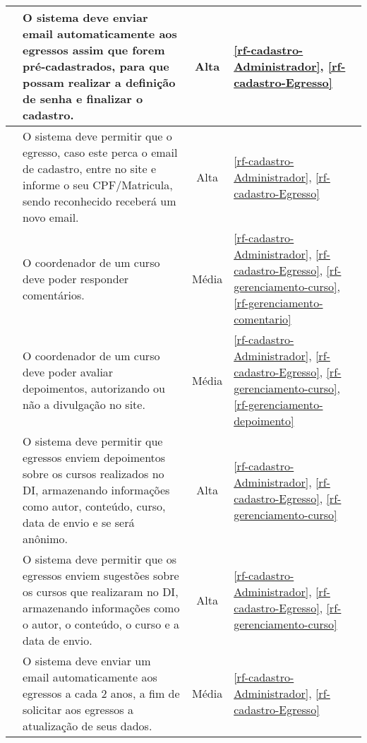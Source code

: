 \begin{landscape}
\begin{longtable}{|c|p{16.5cm}|c|p{2.3cm}|}
			\RF\label{rf-email-cadastro-egresso} & O sistema deve enviar email automaticamente aos egressos assim que forem pré-cadastrados, para que possam realizar a definição de senha e finalizar o cadastro. & Alta & 	\ref{rf-cadastro-Administrador},  \ref{rf-cadastro-Egresso} \\ \hline
			
			
			\RF\label{rf-novo-email-cadastro}  & O sistema deve permitir que o egresso, caso este perca o email de cadastro, entre no site e informe o seu CPF/Matricula, sendo reconhecido receberá um novo email. & Alta & \ref{rf-cadastro-Administrador},  \ref{rf-cadastro-Egresso} \\ \hline  
			
			\RF\label{rf-coordenador-responder-comentario}  &  O coordenador de um curso deve poder responder comentários. & Média & \ref{rf-cadastro-Administrador}, \ref{rf-cadastro-Egresso}, \ref{rf-gerenciamento-curso}, \ref{rf-gerenciamento-comentario} \\ \hline
					
			\RF\label{rf-coordenador-avaliar-depoimento}  &  O coordenador de um curso deve poder avaliar depoimentos, autorizando ou não a divulgação no site. & Média & \ref{rf-cadastro-Administrador}, \ref{rf-cadastro-Egresso}, \ref{rf-gerenciamento-curso}, \ref{rf-gerenciamento-depoimento} \\ \hline
					
			
			
			
			\RF\label{rf-gerenciamento-depoimento} & O sistema deve permitir que egressos enviem depoimentos sobre os cursos realizados no DI, armazenando informações como autor, conteúdo, curso, data de envio e se será anônimo. & Alta & \ref{rf-cadastro-Administrador}, \ref{rf-cadastro-Egresso}, \ref{rf-gerenciamento-curso} \\ \hline 
					
			\RF\label{rf-gerenciamento-comentario}  & O sistema deve permitir que os egressos enviem sugestões sobre os cursos que realizaram no DI, armazenando informações como o autor, o conteúdo, o curso e a data de envio. & 	Alta &  	\ref{rf-cadastro-Administrador}, \ref{rf-cadastro-Egresso}, \ref{rf-gerenciamento-curso} \\ \hline 
					
			\RF\label{rf-email-atualizacao-dados}  & O sistema deve enviar um email automaticamente aos egressos a cada 2 anos, a fim de solicitar aos egressos a atualização de seus dados. & 	Média & \ref{rf-cadastro-Administrador}, \ref{rf-cadastro-Egresso} \\ \hline 
					

\end{longtable}
\end{landscape}
